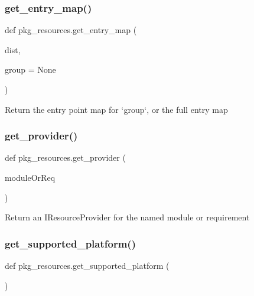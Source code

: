 \subsubsection{\texorpdfstring{get\+\_\+entry\+\_\+map()}{get\_entry\_map()}}
{\footnotesize\ttfamily def pkg\+\_\+resources.\+get\+\_\+entry\+\_\+map (\begin{DoxyParamCaption}\item[{}]{dist,  }\item[{}]{group = {\ttfamily None} }\end{DoxyParamCaption})}

\begin{DoxyVerb}Return the entry point map for `group`, or the full entry map\end{DoxyVerb}
 \mbox{\label{namespacepkg__resources_ae7d5476e7cb36e118cf324cda5f2ace5}} 
\subsubsection{\texorpdfstring{get\+\_\+provider()}{get\_provider()}}
{\footnotesize\ttfamily def pkg\+\_\+resources.\+get\+\_\+provider (\begin{DoxyParamCaption}\item[{}]{module\+Or\+Req }\end{DoxyParamCaption})}

\begin{DoxyVerb}Return an IResourceProvider for the named module or requirement\end{DoxyVerb}
 \mbox{\label{namespacepkg__resources_a2ad1c6a7e428d89c722264e41cc9214e}} 
\subsubsection{\texorpdfstring{get\+\_\+supported\+\_\+platform()}{get\_supported\_platform()}}
{\footnotesize\ttfamily def pkg\+\_\+resources.\+get\+\_\+supported\+\_\+platform (\begin{DoxyParamCaption}{ }\end{DoxyParamCaption})}

